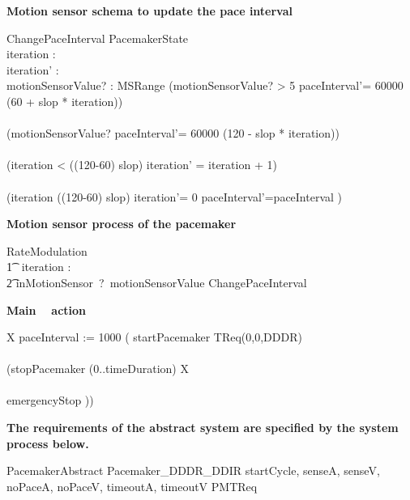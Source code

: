 \textbf{Motion sensor schema to update the pace interval} 

\begin{schema}{ChangePaceInterval}
\Delta PacemakerState \\
iteration : \nat \\
iteration' : \nat \\
motionSensorValue? : MSRange 
\where
(motionSensorValue? > 5 \land paceInterval'= 60000 \div (60 + slop * iteration))\\
\lor \\
(motionSensorValue?  \land paceInterval'= 60000 \div (120 - slop * iteration))\\
\land \\
(iteration < ((120-60) \div slop) \land iteration' = iteration + 1)   \\
\lor \\
(iteration \geq ((120-60) \div slop) \land iteration'= 0 \land paceInterval'=paceInterval ) \\  
\end{schema}

\textbf{Motion sensor process of the pacemaker} 

\begin{circusaction}
RateModulation \circdef \\
\t1 \circvres\ iteration :\nat  \circspot \\
\t2 inMotionSensor~?~motionSensorValue \then ChangePaceInterval
\end{circusaction}



\textbf{ Main \Circus~ action }\\

\begin{circusaction}
	\circspot \circmu X \circspot paceInterval := 1000 \circseq ( startPacemaker \then TReq(0,0,DDDR) \\ 
   \circinterrupt \\
  (stopPacemaker \then \circwait(0..timeDuration) \circseq X \\ 
  \extchoice \\
  emergencyStop \then \Stop))
\end{circusaction}


\begin{circus}
  \circend
\end{circus}


\textbf{The requirements of the abstract system are specified by the system process below. }\\

\begin{circus}
\circprocess PacemakerAbstract \circdef  Pacemaker\_DDDR\_DDIR \lpar \lchanset startCycle, senseA, senseV, noPaceA, noPaceV, timeoutA, timeoutV \rchanset \rpar PMTReq
\end{circus}
